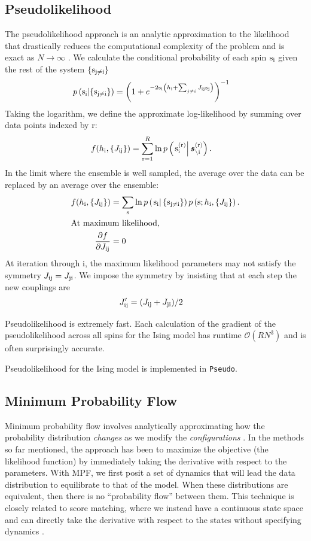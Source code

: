 \documentclass[aps,prl,twocolumn,nofootinbib]{revtex4-1}
\begin{document}
\subsection{Pseudolikelihood}
The pseudolikelihood approach is an analytic approximation to the likelihood that drastically reduces the computational complexity of the problem and is exact as $N \rightarrow \infty$ \cite{Aurell:2012hi}. We calculate the conditional probability of each spin ${\rm s}_{\rm i}$ given the rest of the system $\{{\rm s}_{\rm j\neq i}\}$
\begin{align}
	p\left({\rm s}_{\rm i}|\{{\rm s}_{\rm j\neq i}\}\right) &= \left( 1+e^{-2{\rm s}_{\rm i} \left(h_{\rm i}+\sum_{j\neq i}J_{\rm ij}{\rm s}_{\rm j}\right)} \right)^{-1}
\end{align}
Taking the logarithm, we define the approximate log-likelihood by summing over data points indexed by r:
\begin{align}
	f(h_{\rm i},\{J_{\rm ij}\}) &= \sum_{\rm r=1}^R \ln p\left(\left.{\rm s}_{\rm i}^{(\rm r)}\right|\boldsymbol{s}_{\backslash\rm i}^{(\rm r)}\right).
\end{align}
In the limit where the ensemble is well sampled, the average over the data can be replaced by an average over the ensemble:
\begin{align}
	f(h_{\rm i},\{J_{\rm ij}\}) &= \sum_{\rm s} \ln p\left(\left.{\rm s}_{\rm i}\right|\{{\rm s}_{\rm j\neq i}\}\right)p\left({\rm s};h_{\rm i},\{J_{\rm ij}\}\right).\\
\intertext{At maximum likelihood,}
	\frac{\partial f}{\partial J_{\rm ij}} &=0
\end{align}
At iteration through i, the maximum likelihood parameters may not satisfy the symmetry $J_{\rm ij}=J_{\rm ji}$. We impose the symmetry by insisting that at each step the new couplings are
\begin{align}
	J_{\rm ij}' &= (J_{\rm ij}+J_{\rm ji})/2
\end{align}

Pseudolikelihood is extremely fast. Each calculation of the gradient of the pseudolikelihood across all spins for the Ising model has runtime $\mathcal{O}(RN^3)$ and is often surprisingly accurate.

Pseudolikelihood for the Ising model is implemented in {\tt Pseudo}.

\subsection{Minimum Probability Flow}
Minimum probability flow involves analytically approximating how the probability distribution \textit{changes} as we modify the \textit{configurations} \cite{Sohl-Dickstein:2009tt,SohlDickstein:2011im}. In the methods so far mentioned, the approach has been to maximize the objective (the likelihood function) by immediately taking the derivative with respect to the parameters. With MPF, we first posit a set of dynamics that will lead the data distribution to equilibrate to that of the model. When these distributions are equivalent, then there is no ``probability flow'' between them. This technique is closely related to score matching, where we instead have a continuous state space and can directly take the derivative with respect to the states without specifying dynamics \cite{Hyvarinen:2007ed}.
\end{document}

